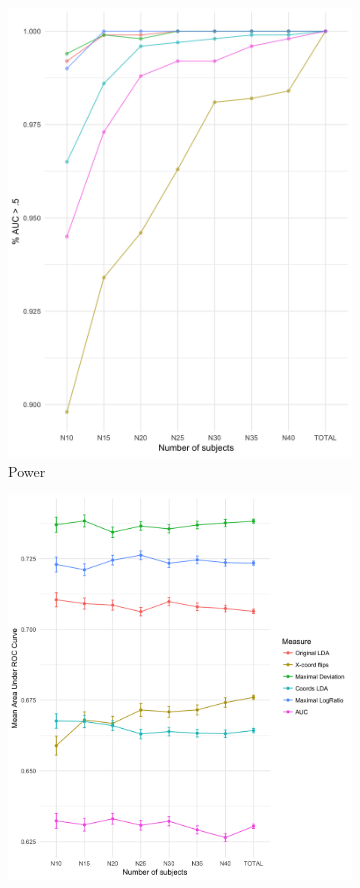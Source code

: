 \documentclass{article}
\begin{document}
\begin{itemize}
\begin{figure}
\centering
\begin{subfigure}[b]{0.4\textwidth}
\includegraphics[width=\textwidth]{MeasurePower.png}
\caption{Power}\label{fig:power}
\end{subfigure}
\begin{subfigure}[b]{0.5\textwidth}
\includegraphics[width=\textwidth]{MeasureAUC_means.png}

\end{subfigure}
\end{figure}
\end{itemize}
\end{document}
